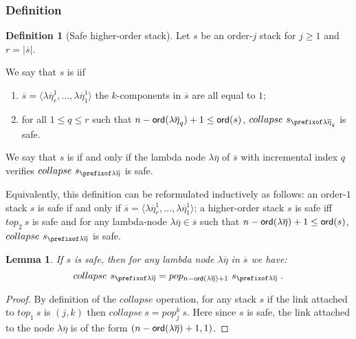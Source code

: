 \documentclass{article}
\newtheorem{lemma}{Lemma}[section]
\theoremstyle{remark}
\theoremstyle{definition}
\newtheorem{definition}{Definition}[section]
\newcommand\orddec\overline
\begin{document}
\subsubsection{Definition}

\begin{definition}[Safe higher-order stack]
\label{dfn:safestack} Let $s$ be an order-$j$ stack for $j\geq1$ and $r
= |\orddec{s}|$.

We say that $s$ is  iif
    \begin{enumerate}[1.]
    \item $\orddec{s} = \langle \lambda \overline\eta_r^1, \ldots ,
    \lambda \overline{\eta}_1^1 \rangle$ \ie the $k$-components in $\orddec{s}$ are all equal to $1$;
    \item for all $1 \leq q \leq r$ such that $n-{\sf ord}(\lambda \overline\eta_q)+1 \leq {\sf ord}(s)$,
    $collapse~s_{\prefixof \lambda\overline\eta_q}$ is safe.
    \end{enumerate}

We say that $s$ is  if and only if the lambda node
$\lambda\overline\eta$ of $\orddec{s}$ with incremental index $q$ verifies
    $collapse~s_{\prefixof \lambda\overline\eta}$ is safe.
\end{definition}

Equivalently, this definition can be reformulated inductively as follows:
an order-$1$ stack $s$ is safe if and only if $\orddec{s} = \langle \lambda \overline{\eta}_r^1, \ldots , \lambda \overline{\eta}_1^1 \rangle$;
a higher-order stack $s$ is safe iff $top_2~s$ is safe and
for any lambda-node $\lambda\overline\eta \in \orddec{s}$ such that $n-{\sf ord}(\lambda \overline{\eta})+1 \leq {\sf ord}(s)$,
    $collapse~s_{\prefixof\lambda\overline\eta}$ is safe.


\begin{lemma}
\label{lem:safecollapsesimulation}
If $s$ is safe, then for any lambda node $\lambda\overline\eta$ in $\orddec{s}$ we have:
$$collapse~s_{\prefixof\lambda\overline\eta} = pop_{n-\ord{\lambda\overline\eta}+1} ~s_{\prefixof\lambda\overline\eta} \ . $$
\end{lemma}

\begin{proof}
By definition of the $collapse$ operation, for any stack $s$ if the link attached to $top_1~s$ is $(j,k)$ then $collapse~s = pop_j^k~s$. Here since $s$ is safe, the link attached to the node $\lambda\overline\eta$ is of the form
$(n-{\sf ord}(\lambda\overline\eta)+1,1)$.
\end{proof}
\end{document}
